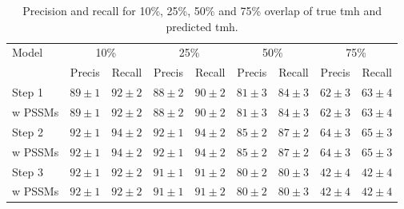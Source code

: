 \begin{table}
	\centering 
	\begin{subtable}[]{\textwidth}
		\begin{tabular}{l|c|c|c|c|c|c|c|c} 
			Model & \multicolumn{2}{|c}{10\%}& \multicolumn{2}{|c}{25\%}& \multicolumn{2}{|c}{50\%}& \multicolumn{2}{|c}{75\%}\\ 
			& Precis & Recall & Precis & Recall & Precis & Recall & Precis & Recall \\ \hline 
			Step 1 & $ 89 \pm 1 $ & $ 92 \pm 2 $ & $ 88 \pm 2 $ & $ 90 \pm 2 $ & $ 81 \pm 3 $ & $ 84 \pm 3 $ & $ 62 \pm 3 $ & $ 63 \pm 4 $ \\ 
			w PSSMs& $ 89 \pm 1 $ & $ 92 \pm 2 $ & $ 88 \pm 2 $ & $ 90 \pm 2 $ & $ 81 \pm 3 $ & $ 84 \pm 3 $ & $ 62 \pm 3 $ & $ 63 \pm 4 $ \\
			Step 2 & $ 92 \pm 1 $ & $ 94 \pm 2 $ & $ 92 \pm 1 $ & $ 94 \pm 2 $ & $ 85 \pm 2 $ & $ 87 \pm 2 $ & $ 64 \pm 3 $ & $ 65 \pm 3 $ \\ 
			w PSSMs& $ 92 \pm 1 $ & $ 94 \pm 2 $ & $ 92 \pm 1 $ & $ 94 \pm 2 $ & $ 85 \pm 2 $ & $ 87 \pm 2 $ & $ 64 \pm 3 $ & $ 65 \pm 3 $ \\ 
			Step 3 & $ 92 \pm 1 $ & $ 92 \pm 2 $ & $ 91 \pm 1 $ & $ 91 \pm 2 $ & $ 80 \pm 2 $ & $ 80 \pm 3 $ & $ 42 \pm 4 $ & $ 42 \pm 4 $ \\
			w PSSMs& $ 92 \pm 1 $ & $ 92 \pm 2 $ & $ 91 \pm 1 $ & $ 91 \pm 2 $ & $ 80 \pm 2 $ & $ 80 \pm 3 $ & $ 42 \pm 4 $ & $ 42 \pm 4 $ \\  
		\end{tabular}
		\caption{Precision and recall for 10\%, 25\%, 50\% and 75\% overlap of true \gls{tmh} and predicted \gls{tmh}.}
		\label{tab:overlap}
	\end{subtable}
	

\end{table}
